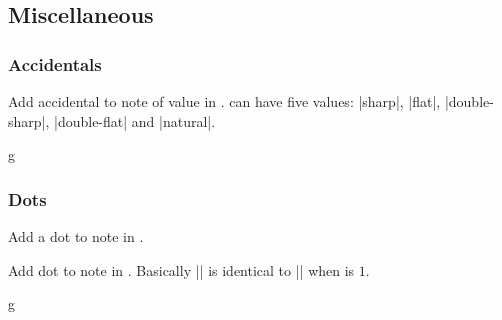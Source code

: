 \subsection{Miscellaneous}\label{sec:music-notes:misc}
\subsubsection{Accidentals}\label{sec:music-notes:misc:accidentals}
\begin{command}{\tmappendaccidental{}}
  Add accidental  to note of value  in 
  .  can have five values: |sharp|, |flat|, 
  |double-sharp|, |double-flat| and |natural|.
\end{command}
\begin{codeexample}[]
\begin{tmline}%
\begin{tmstaff}{g}{}
\end{tmstaff}%
\end{tmline}
\end{codeexample}
\subsubsection{Dots}\label{sec:music-notes:misc:dots}
\begin{command}{\tmadddot{}}
  Add a dot to note in .
\end{command}
\begin{command}{\tmadddot*{}}
  Add  dot to note in . 
  Basically |\tmadddot| is identical to |\tmadddot*| when 
   is $1$.
\end{command}
\begin{codeexample}[]
\begin{tmline}%
\begin{tmstaff}{g}{}
\end{tmstaff}%
\end{tmline}
\end{codeexample}
